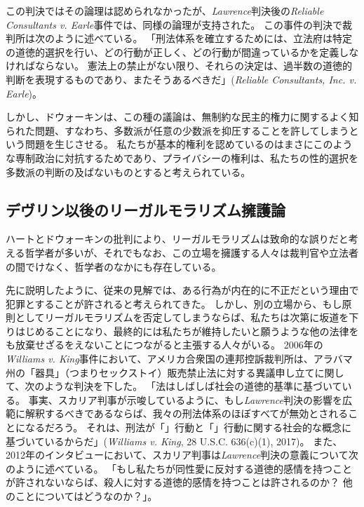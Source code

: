 \documentclass[paper=a4,book,openany]{jlreq} \usepackage{mystyle}
\begin{document}
この判決ではその論理は認められなかったが、\emph{Lawrence}判決後の\emph{Reliable Consultants v. Earle}事件では、同様の論理が支持された。
この事件の判決で裁判所は次のように述べている。
「刑法体系を確立するためには、立法府は特定の道徳的選択を行い、どの行動が正しく、どの行動が間違っているかを定義しなければならない。
憲法上の禁止がない限り、それらの決定は、過半数の道徳的判断を表現するものであり、またそうあるべきだ」(\emph{Reliable Consultants, Inc. v. Earle})。

しかし、ドウォーキンは、この種の議論は、無制約な民主的権力に関するよく知られた問題、すなわち、多数派が任意の少数派を抑圧することを許してしまうという問題を生じさせる。
私たちが基本的権利を認めているのはまさにこのような専制政治に対抗するためであり、プライバシーの権利は、私たちの性的選択を多数派の判断の及ばないものとすると考えられている。

\subsection{デヴリン以後のリーガルモラリズム擁護論}

ハートとドウォーキンの批判により、リーガルモラリズムは致命的な誤りだと考える哲学者が多いが、それでもなお、この立場を擁護する人々は裁判官や立法者の間でけなく、哲学者のなかにも存在している。

先に説明したように、従来の見解では、ある行為が内在的に不正だという理由で犯罪とすることが許されると考えられてきた。
しかし、別の立場から、もし原則としてリーガルモラリズムを否定してしまうならば、私たちは次第に坂道を下りはじめることになり、最終的には私たちが維持したいと願うような他の法律をも放棄せざるをえないことにつながると主張する人々がいる。
2006年の\emph{Williams v. King}事件において、アメリカ合衆国の連邦控訴裁判所は、アラバマ州の「器具」（つまりセックストイ）販売禁止法に対する異議申し立てに関して、次のような判決を下した。
「法はしばしば社会の道徳的基準に基づいている。
事実、スカリア判事が示唆しているように、もし\emph{Lawrence}判決の影響を広範に解釈するべきであるならば、我々の刑法体系のほぼすべてが無効とされることになるだろう。
それは、刑法が「」行動と「」行動に関する社会的な概念に基づいているからだ」(\emph{Williams v. King}, 28 U.S.C. 636(c)(1), 2017)。
また、2012年のインタビューにおいて、スカリア判事は\emph{Lawrence}判決の意義について次のように述べている。
「もし私たちが同性愛に反対する道徳的感情を持つことが許されないならば、殺人に対する道徳的感情を持つことは許されるのか？ 他のことについてはどうなのか？」\citep{sink12:_justic_scalia_defen_compar_laws_homos_murder}。
\end{document}
